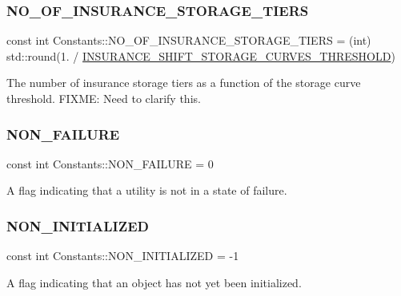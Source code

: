 \subsubsection{\texorpdfstring{N\+O\+\_\+\+O\+F\+\_\+\+I\+N\+S\+U\+R\+A\+N\+C\+E\+\_\+\+S\+T\+O\+R\+A\+G\+E\+\_\+\+T\+I\+E\+RS}{NO\_OF\_INSURANCE\_STORAGE\_TIERS}}
{\footnotesize\ttfamily const int Constants\+::\+N\+O\+\_\+\+O\+F\+\_\+\+I\+N\+S\+U\+R\+A\+N\+C\+E\+\_\+\+S\+T\+O\+R\+A\+G\+E\+\_\+\+T\+I\+E\+RS = (int) std\+::round(1. / \mbox{\hyperlink{classConstants_a40ab8dd088d886af9b5795c6b9db22ca}{I\+N\+S\+U\+R\+A\+N\+C\+E\+\_\+\+S\+H\+I\+F\+T\+\_\+\+S\+T\+O\+R\+A\+G\+E\+\_\+\+C\+U\+R\+V\+E\+S\+\_\+\+T\+H\+R\+E\+S\+H\+O\+LD}})}



The number of insurance storage tiers as a function of the storage curve threshold. F\+I\+X\+ME\+: Need to clarify this. 

\mbox{\label{classConstants_a0595423b130c1645b173272f50338ed9}} 
\subsubsection{\texorpdfstring{N\+O\+N\+\_\+\+F\+A\+I\+L\+U\+RE}{NON\_FAILURE}}
{\footnotesize\ttfamily const int Constants\+::\+N\+O\+N\+\_\+\+F\+A\+I\+L\+U\+RE = 0}



A flag indicating that a utility is not in a state of failure. 

\mbox{\label{classConstants_a8e8b0a537619c378d03117c5ed1c3ea1}} 
\subsubsection{\texorpdfstring{N\+O\+N\+\_\+\+I\+N\+I\+T\+I\+A\+L\+I\+Z\+ED}{NON\_INITIALIZED}}
{\footnotesize\ttfamily const int Constants\+::\+N\+O\+N\+\_\+\+I\+N\+I\+T\+I\+A\+L\+I\+Z\+ED = -\/1}



A flag indicating that an object has not yet been initialized. 

